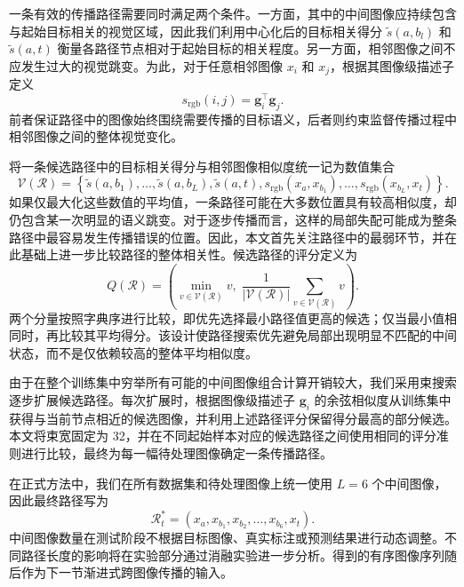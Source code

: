 \documentclass[UTF8,a4paper,10pt]{ctexart}
\begin{document}
一条有效的传播路径需要同时满足两个条件。一方面，其中的中间图像应持续包含与起始目标相关的视觉区域，因此我们利用中心化后的目标相关得分
$\widetilde{s}(a,b_l)$ 和 $\widetilde{s}(a,t)$
衡量各路径节点相对于起始目标的相关程度。另一方面，相邻图像之间不应发生过大的视觉跳变。为此，对于任意相邻图像 $x_i$ 和 $x_j$，根据其图像级描述子定义
\begin{equation}
s_{\mathrm{rgb}}(i,j)
=
\mathbf{g}_i^{\top}\mathbf{g}_j.
\end{equation}
前者保证路径中的图像始终围绕需要传播的目标语义，后者则约束监督传播过程中相邻图像之间的整体视觉变化。

将一条候选路径中的目标相关得分与相邻图像相似度统一记为数值集合
\begin{equation}
\mathcal{V}(\mathcal{R})
=
\left\{
\widetilde{s}(a,b_1),
\ldots,
\widetilde{s}(a,b_L),
\widetilde{s}(a,t),
s_{\mathrm{rgb}}(x_a,x_{b_1}),
\ldots,
s_{\mathrm{rgb}}(x_{b_L},x_t)
\right\}.
\end{equation}
如果仅最大化这些数值的平均值，一条路径可能在大多数位置具有较高相似度，却仍包含某一次明显的语义跳变。对于逐步传播而言，这样的局部失配可能成为整条路径中最容易发生传播错误的位置。因此，本文首先关注路径中的最弱环节，并在此基础上进一步比较路径的整体相关性。候选路径的评分定义为
\begin{equation}
Q(\mathcal{R})
=
\left(
\min_{v\in\mathcal{V}(\mathcal{R})}v,\;
\frac{1}{|\mathcal{V}(\mathcal{R})|}
\sum_{v\in\mathcal{V}(\mathcal{R})}v
\right).
\end{equation}
两个分量按照字典序进行比较，即优先选择最小路径值更高的候选；仅当最小值相同时，再比较其平均得分。该设计使路径搜索优先避免局部出现明显不匹配的中间状态，而不是仅依赖较高的整体平均相似度。

由于在整个训练集中穷举所有可能的中间图像组合计算开销较大，我们采用束搜索逐步扩展候选路径。每次扩展时，根据图像级描述子 $\mathbf{g}_i$ 的余弦相似度从训练集中获得与当前节点相近的候选图像，并利用上述路径评分保留得分最高的部分候选。本文将束宽固定为 32，并在不同起始样本对应的候选路径之间使用相同的评分准则进行比较，最终为每一幅待处理图像确定一条传播路径。

在正式方法中，我们在所有数据集和待处理图像上统一使用 $L=6$ 个中间图像，因此最终路径写为
\begin{equation}
\mathcal{R}_t^{*}
=
\left(
x_a,
x_{b_1},
x_{b_2},
\ldots,
x_{b_6},
x_t
\right).
\end{equation}
中间图像数量在测试阶段不根据目标图像、真实标注或预测结果进行动态调整。不同路径长度的影响将在实验部分通过消融实验进一步分析。得到的有序图像序列随后作为下一节渐进式跨图像传播的输入。
\end{document}
